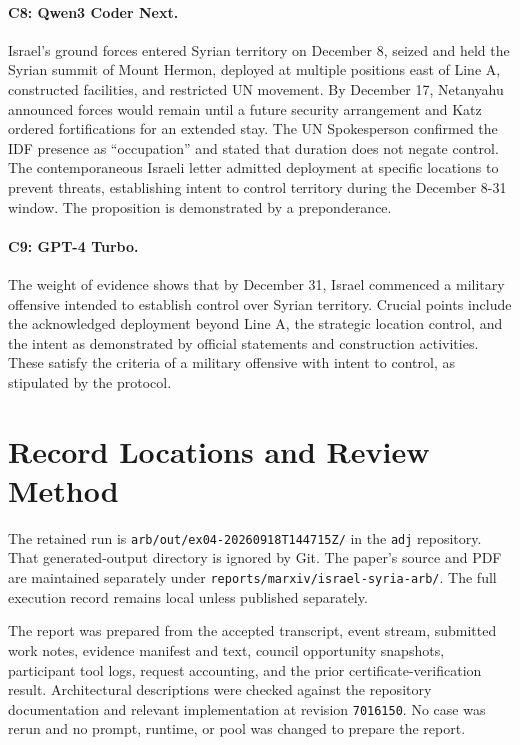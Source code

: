 \documentclass[11pt]{article}
\newcommand{\code}[1]{\texttt{#1}}
\begin{document}
\paragraph{C8: Qwen3 Coder Next.}
Israel's ground forces entered Syrian territory on December 8, seized and held the Syrian summit of Mount Hermon, deployed at multiple positions east of Line A, constructed facilities, and restricted UN movement. By December 17, Netanyahu announced forces would remain until a future security arrangement and Katz ordered fortifications for an extended stay. The UN Spokesperson confirmed the IDF presence as ``occupation'' and stated that duration does not negate control. The contemporaneous Israeli letter admitted deployment at specific locations to prevent threats, establishing intent to control territory during the December 8-31 window. The proposition is demonstrated by a preponderance.

\paragraph{C9: GPT-4 Turbo.}
The weight of evidence shows that by December 31, Israel commenced a military offensive intended to establish control over Syrian territory. Crucial points include the acknowledged deployment beyond Line A, the strategic location control, and the intent as demonstrated by official statements and construction activities. These satisfy the criteria of a military offensive with intent to control, as stipulated by the protocol.

\section{Record Locations and Review Method}
\label{app:record}

The retained run is \code{arb/out/ex04-20260918T144715Z/} in the \code{adj} repository.  That generated-output directory is ignored by Git.  The paper's source and PDF are maintained separately under \code{reports/marxiv/israel-syria-arb/}.  The full execution record remains local unless published separately.

The report was prepared from the accepted transcript, event stream, submitted work notes, evidence manifest and text, council opportunity snapshots, participant tool logs, request accounting, and the prior certificate-verification result.  Architectural descriptions were checked against the repository documentation and relevant implementation at revision \code{7016150}.  No case was rerun and no prompt, runtime, or pool was changed to prepare the report.
\end{document}
